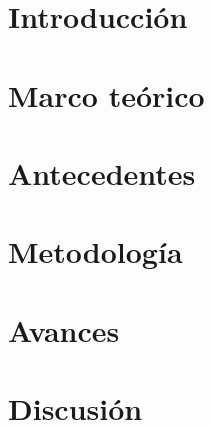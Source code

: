 \documentclass[12pt,letterpaper]{report}
\begin{document}


\tableofcontents
\newpage
{}

\chapter{Introducción}


%
%
%

\chapter{Marco teórico}


\chapter{Antecedentes}


%
%
%

\chapter{Metodología}


\chapter{Avances}
%

\chapter{Discusión}


\renewcommand{\bibname}{Referencias}


\end{document}
